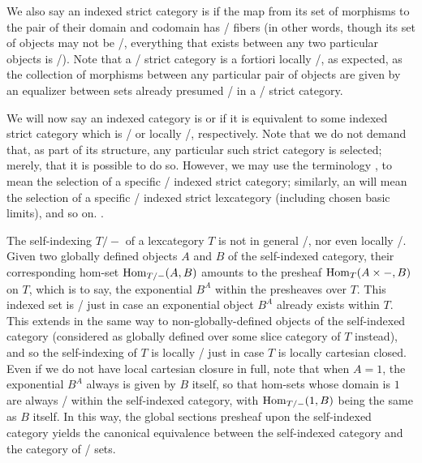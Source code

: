 We also say an indexed strict category is  if the map from its set of morphisms to the pair of their domain and codomain has \repsmall/ fibers (in other words, though its set of objects may not be \repsmall/, everything that exists between any two particular objects is \repsmall/). Note that a \repsmall/ strict category is a fortiori locally \repsmall/, as expected, as the collection of morphisms between any particular pair of objects are given by an equalizer between sets already presumed \repsmall/ in a \repsmall/ strict category.

We will now say an indexed category is  or  if it is equivalent to some indexed strict category which is \repsmall/ or locally \repsmall/, respectively. Note that we do not demand that, as part of its structure, any particular such strict category is selected; merely, that it is possible to do so. However, we may use the terminology , to mean the selection of a specific \repsmall/ indexed strict category; similarly, an  will mean the selection of a specific \repsmall/ indexed strict lexcategory (including chosen basic limits), and so on. .

The self-indexing $T/-$ of a lexcategory $T$ is not in general \repsmall/, nor even locally \repsmall/. Given two globally defined objects $A$ and $B$ of the self-indexed category, their corresponding hom-set $\operatorname{Hom}_{T/-}(A, B)$ amounts to the presheaf $\operatorname{Hom}_{T}(A \times -, B)$ on $T$, which is to say, the exponential $B^A$ within the presheaves over $T$. This indexed set is \repsmall/ just in case an exponential object $B^A$ already exists within $T$. This extends in the same way to non-globally-defined objects of the self-indexed category (considered as globally defined over some slice category of $T$ instead), and so the self-indexing of $T$ is locally \repsmall/ just in case $T$ is locally cartesian closed. Even if we do not have local cartesian closure in full, note that when $A = 1$, the exponential $B^A$ always is given by $B$ itself, so that hom-sets whose domain is $1$ are always \repsmall/ within the self-indexed category, with $\operatorname{Hom}_{T/-}(1, B)$ being the same as $B$ itself. In this way, the global sections presheaf upon the self-indexed category yields the canonical equivalence between the self-indexed category and the category of \repsmall/ sets.

